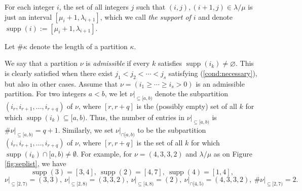 \documentclass[12pt]{article}
\theoremstyle{plain}
\theoremstyle{definition}
\def\seplistvar{{{\nu}}} %
\def\supp{{\operatorname{supp}}}
\def\lm{{\lambda/\mu}}
\begin{document}
\begin{comment}
 
\footnote{By this, we mean that $\lm$ has at least one
cell, and cannot be represented
as a disjoint union of two nonempty skew partitions $\alpha/\beta$
and $\gamma/\delta$ such that no cell of $\alpha/\beta$ is adjacent
to any cell of $\gamma/\delta$. This is a harmless assumption,
since every skew partition $\lm$ can be written as a disjoint union
of such connected skew partitions, and these ``connected
components'' do not interact when it comes to studying rpps:
Choosing a 12-rpp of shape $\lm$ is tantamount to choosing
a 12-rpp for each of these components; and choosing a 12-rpp of
shape $\lm$ with seplist-partition equal to a given partition
$\seplistvar$ is tantamount to choosing a 12-rpp for each of the
components with seplist-partition equal to the ``appropriate piece''
of $\seplistvar$. (What an ``appropriate piece'' is should be
clear enough, since two distinct connected components are supported
on different rows.)}.

\end{comment}

\newcommand{\nuxy}[2]{\seplistvar\big|_{\subseteq[#1,#2)}}
\newcommand{\nuxycap}[2]{\seplistvar\big|_{\cap[#1,#2)}}
\newcommand{\nupxy}[2]{\seplistvar^{\prime}\big|_{\subseteq[#1,#2)}}

\def\nuab{\nuxy{a}{b}}
\def\nuabcap{\nuxycap{a}{b}}



For each integer $i$, the set of all integers $j$ such that $(i,j),(i+1,j)\in\lm$ is just an interval $[\mu_{i}+1,\lambda_{i+1}]$, which we call \textit{the support of $i$} and denote $\supp(i):=[\mu_{i}+1,\lambda_{i+1}]$.

Let $\#\kappa$ denote the length of a partition $\kappa$.

We say that a partition $\seplistvar$ is \textit{admissible} if
every $k$ satisfies $\supp(i_k) \neq \varnothing$. This is
clearly satisfied when there exist $j_1<j_2<\cdots<j_s$
satisfying (\ref{cond:necessary}), but also in other cases.
Assume that $\seplistvar = \left(i_1 \geq \cdots \geq i_s > 0\right)$ is an admissible partition.
For two integers $a< b$, we let $\nuab$ denote the subpartition $(i_r,i_{r+1},\dots,i_{r+q})$ of $\seplistvar$, where $[r, r+q]$ is the (possibly empty) set of all $k$ for which $\supp(i_k)\subseteq [a,b)$. Thus, the number of entries in $\nuab$ is $\#\nuab =q+1$. Similarly, we set $\nuabcap$ to be the subpartition $(i_r,i_{r+1},\dots,i_{r+q})$ of $\seplistvar$, where $[r, r+q]$ is the set of all $k$ for which $\supp(i_k)\cap [a,b)\neq\emptyset$.
For example, for $\seplistvar=(4,3,3,2)$ and $\lm$ as on Figure \ref{fig:seplist}, we have 
$$\supp(3)=[3,4],\ \supp(2)=[4,7],\ \supp(4)=[1,4],$$ 
$$\nuxy{2}{7}=(3,3),\ \nuxy{2}{8}=(3,3,2),\ \nuxy{4}{8}=(2),\ \nuxycap{4}{5}=(4,3,3,2),\ \#\nuxy{2}{7}=2.$$
\end{document}
